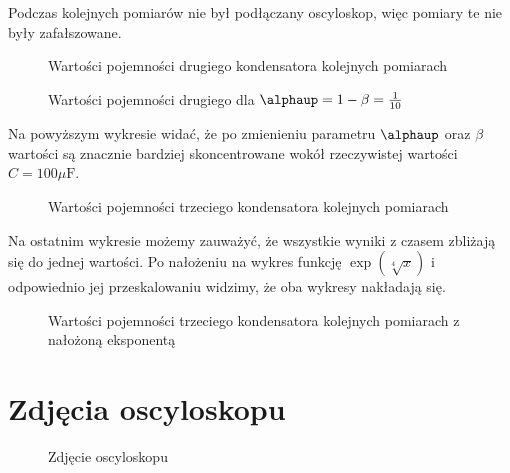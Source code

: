 \documentclass[12pt]{mwrep}
\let\alpha\alphaup
\begin{document}
	Podczas kolejnych pomiarów nie był podłączany oscyloskop, więc pomiary te nie były zafałszowane.
	\begin{figure}[H]\caption{Wartości pojemności drugiego kondensatora kolejnych pomiarach}\label{fig:pom2_farad}
	\end{figure}
	\begin{figure}[H]\caption{Wartości pojemności drugiego dla  $\alpha=1-\beta=\frac{1}{10}$}\label{fig:fake_farad}
	\end{figure}
	Na powyższym wykresie widać, że po zmienieniu parametru $\alpha$ oraz $\beta$ wartości są znacznie bardziej skoncentrowane wokół rzeczywistej wartości $C=100\mu \text{F}$.
	\begin{figure}[H]\caption{Wartości pojemności trzeciego kondensatora kolejnych pomiarach}\label{fig:pom3_farad}
	\end{figure}
	Na ostatnim wykresie możemy zauważyć, że wszystkie wyniki z czasem zbliżają się do jednej wartości. Po nałożeniu na wykres funkcję $\exp\left(\sqrt[4]{x}\right)$ i odpowiednio jej przeskalowaniu widzimy, że oba wykresy nakładają się.
	\begin{figure}[H]\caption{Wartości pojemności trzeciego kondensatora kolejnych pomiarach z nałożoną eksponentą}\label{fig:pom3_farad_line}
	\end{figure}
	
	
	\section{Zdjęcia oscyloskopu}%
	
	\begin{figure}[H]\caption{Zdjęcie oscyloskopu}\label{fig:oscy}
	\end{figure}
	
\end{document}
